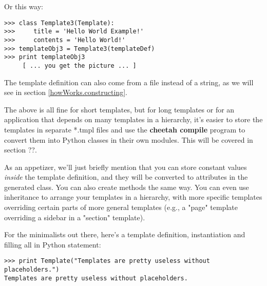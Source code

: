 Or this way:

\begin{verbatim}
>>> class Template3(Template):
>>>     title = 'Hello World Example!'
>>>     contents = 'Hello World!'
>>> templateObj3 = Template3(templateDef)
>>> print templateObj3
     [ ... you get the picture ... ]
\end{verbatim}

The template definition can also come from a file instead of a string,
as we will see in section \ref{howWorks.constructing}.

The above is all fine for short templates, but for long templates or
for an application that depends on many templates in a hierarchy, it's
easier to store the templates in separate *.tmpl files and use the
{\bf cheetah compile} program to convert them into Python classes in
their own modules.  This will be covered in section ??.  

As an appetizer, we'll just briefly mention that you can store constant values
{\em inside} the template definition, and they will be converted to attributes
in the generated class.  You can also create methods the same way.
You can even use inheritance to arrange your templates in a hierarchy,
with more specific templates overriding certain parts of more general
templates (e.g., a "page" template overriding a sidebar in a "section"
template).

For the minimalists out there, here's a template definition,
instantiation and filling all in Python statement:

\begin{verbatim}
>>> print Template("Templates are pretty useless without placeholders.")
Templates are pretty useless without placeholders.
\end{verbatim}



